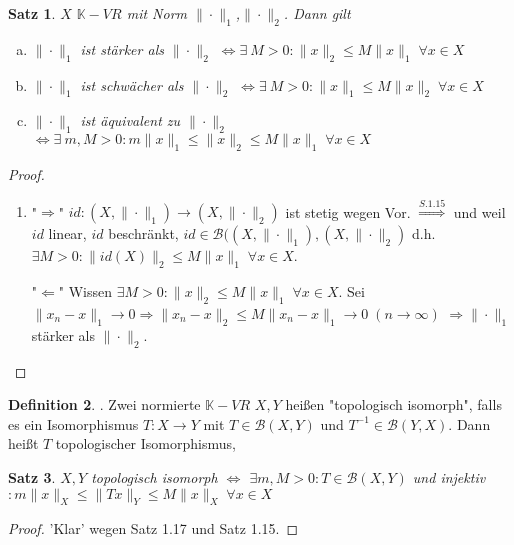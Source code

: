 \documentclass[ngerman]{report}
\theoremstyle{plain}%
\newtheorem{thm}{Satz}[chapter]
\theoremstyle{definition}%
\newtheorem{definition}[thm]{Definition}
\theoremstyle{myStyle}
\newcommand{\K}{\mathbb{K}}
\newcommand{\B}{\mathcal{B}} %
\newcommand{\BS}[1][X,Y]{\mathcal{B}(#1)} %
\newcommand{\norm}[1]{\|#1\|}
\newcommand{\df}[1][]{%
	\overset{#1}{\Rightarrow}
}
\newcommand{\aq}{\Leftrightarrow} %
\newcommand{\inv}[1]{#1^{-1}}
\newcommand{\qmarks}[1]{"#1"}
\begin{document}
	\begin{thm}
		$X$ $\K-VR$ mit Norm $\norm{\cdot}_1$,$\norm{\cdot}_2$. Dann gilt 
			\begin{enumerate}[(a)]
				\item $\norm{\cdot}_1$ ist stärker als $\norm{\cdot}_2$ 
					$\aq \exists \: M > 0: \norm{x}_2 \leq M \norm{x}_1 \; \forall x\in X$
				\item $\norm{\cdot}_1$ ist schwächer als $\norm{\cdot}_2$ 
					$\aq \exists \: M > 0: \norm{x}_1 \leq M \norm{x}_2 \; \forall x\in X$
				\item $\norm{\cdot}_1$ ist äquivalent zu $\norm{\cdot}_2$ 
					$\aq \exists \: m,M > 0: m\norm{x}_1 \leq \norm{x}_2 \leq M \norm{x}_1 \; \forall x\in X$
			\end{enumerate}
	
	\end{thm}
	\begin{proof}
		\begin{enumerate}[zu (a):]
	 		\item \qmarks{$\df$} $id : (X,\norm{\cdot}_1) \to (X,\norm{\cdot}_2)$ ist stetig wegen Vor.
				$\df[S.1.15]$ und weil $id$ linear, $id$ beschränkt, 
				$id\in \B((X,\norm{\cdot}_1), (X,\norm{\cdot}_2)$ d.h. 
				$\exists M > 0: \norm{id(X)}_2 \leq M \norm{x}_1 \; \forall x\in X$.\par
			\qmarks{$\Leftarrow$}	Wissen $\exists M>0: \norm{x}_2 \leq M\norm{x}_1 \; \forall x\in X$.
			Sei $\norm{x_n - x}_1 \to 0 \df \norm{x_n - x}_2 \leq M\norm{x_n - x}_1 \to 0 \; (n\to\infty)$
			$\df \norm{\cdot}_1$ stärker als $\norm{\cdot}_2$.
	 	\end{enumerate}
	\end{proof}

	\begin{definition}
		.
		Zwei normierte $\K-VR$ $X,Y$ heißen \qmarks{topologisch isomorph}, falls es ein Isomorphismus 
		$T: X\to Y$ mit $T\in \BS$ und $\inv{T}\in\B(Y,X)$. Dann heißt $T$ topologischer Isomorphismus,
	\end{definition}

	\begin{thm}
		$X, Y$ topologisch isomorph $\aq$ $\exists m,M > 0: T\in \BS$ und injektiv
		$: m\norm{x}_X \leq \norm{Tx}_Y \leq M \norm{x}_X \; \forall x\in X$
	\end{thm}
	\begin{proof}
		'Klar' wegen Satz 1.17 und Satz 1.15.
	\end{proof}
	
\end{document}
